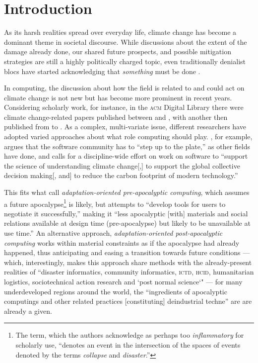 \section{Introduction}

As its harsh realities spread %
over everyday life, climate change has become a dominant theme in societal discourse. While discussions about the extent of the damage already done, our shared future prospects, and possible mitigation strategies are still a highly politically charged topic, even traditionally denialist blocs have started acknowledging that \emph{something} must be done \cite{teirstein_2021}.  

In computing, the discussion about how the field is related to and could act on climate change is not new but has become more prominent in recent years. Considering scholarly work, for instance, in the \textsc{acm} Digital Library there were  climate change-related papers published between  and , with another  then published from  to  \cite{ferreiraClimateChangeCommunication2021}. As a complex, multi-variate issue, different researchers have adopted varied approaches about what role computing should play. \citet{easterbrook2010climate}, for example, argues that the software community has to ``step up to the plate,'' as other fields have done, and calls for a discipline-wide effort on work on software to ``support the science of understanding climate change[,] to support the global collective decision making[, and] to reduce the carbon footprint of modern technology.''

This fits what \citet{silberman2010precarious} call \emph{adaptation-oriented pre-apocalyptic computing}, which assumes a future apocalypse\footnote{The term, which the authors acknowledge as perhaps too \emph{inflammatory} for scholarly use, ``denotes an event in the intersection of the spaces of events denoted by the terms \emph{collapse} and \emph{disaster}.''} is likely, but attempts to ``develop tools for users to negotiate it successfully,'' making it ``less apocalyptic [with] materials and social relations available at design time (pre-apocalypse) but likely to be unavailable at use time.'' An alternative approach, \emph{adaptation-oriented post-apocalyptic computing} works within material constraints as if the apocalypse had already happened, thus anticipating and easing a transition towards future conditions --- which, interestingly, makes this approach share methods with the already-present realities of ``disaster informatics, community informatics, \textsc{ictd}, \textsc{hcid}, humanitarian logistics, sociotechnical action research and `post normal science`" --- for many underdeveloped regions around the world, the ``ingredients of apocalyptic computings and other related practices [constituting] deindustrial techne'' are are already a given.

